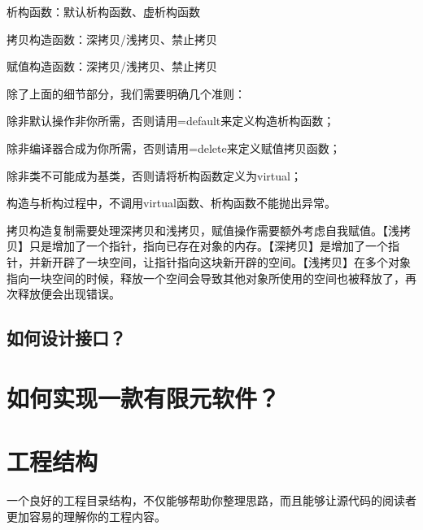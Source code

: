 析构函数：默认析构函数、虚析构函数

拷贝构造函数：深拷贝/浅拷贝、禁止拷贝

赋值构造函数：深拷贝/浅拷贝、禁止拷贝

除了上面的细节部分，我们需要明确几个准则：

除非默认操作非你所需，否则请用=default来定义构造析构函数；

除非编译器合成为你所需，否则请用=delete来定义赋值拷贝函数；

除非类不可能成为基类，否则请将析构函数定义为virtual；

构造与析构过程中，不调用virtual函数、析构函数不能抛出异常。

拷贝构造复制需要处理深拷贝和浅拷贝，赋值操作需要额外考虑自我赋值。【浅拷贝】只是增加了一个指针，指向已存在对象的内存。【深拷贝】是增加了一个指针，并新开辟了一块空间，让指针指向这块新开辟的空间。【浅拷贝】在多个对象指向一块空间的时候，释放一个空间会导致其他对象所使用的空间也被释放了，再次释放便会出现错误。

\subsection{如何设计接口？}
\section{如何实现一款有限元软件？}

\section{工程结构}
一个良好的工程目录结构，不仅能够帮助你整理思路，而且能够让源代码的阅读者更加容易的理解你的工程内容。
